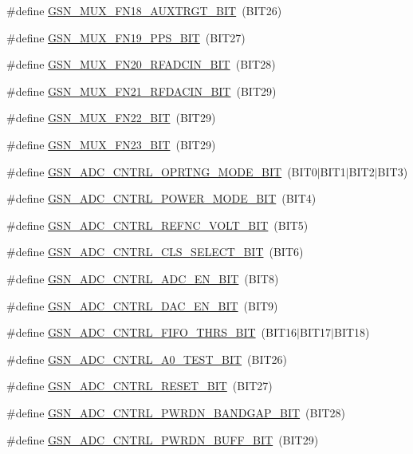 \begin{DoxyCompactItemize}
\item 
\#define \hyperlink{a00546_ab9ab01862c25de4775d41150ca7ac187}{GSN\_\-MUX\_\-FN18\_\-AUXTRGT\_\-BIT}~(BIT26)
\item 
\#define \hyperlink{a00546_a34e272cdfe3fdf3d66d84e62a5d82b6c}{GSN\_\-MUX\_\-FN19\_\-PPS\_\-BIT}~(BIT27)
\item 
\#define \hyperlink{a00546_a2b9c0a55b7508a30e3f610bfc5fc1721}{GSN\_\-MUX\_\-FN20\_\-RFADCIN\_\-BIT}~(BIT28)
\item 
\#define \hyperlink{a00546_a7d2bd2e76493f7c296ad08d8540e06d1}{GSN\_\-MUX\_\-FN21\_\-RFDACIN\_\-BIT}~(BIT29)
\item 
\#define \hyperlink{a00546_a9650fe368133c0fc9d6fae953bf37106}{GSN\_\-MUX\_\-FN22\_\-BIT}~(BIT29)
\item 
\#define \hyperlink{a00546_a88e9d2cb50c9d1779d5020cf87f7e422}{GSN\_\-MUX\_\-FN23\_\-BIT}~(BIT29)
\item 
\#define \hyperlink{a00546_a6a6222308a1c12f65f8f46889f913f22}{GSN\_\-ADC\_\-CNTRL\_\-OPRTNG\_\-MODE\_\-BIT}~(BIT0$|$BIT1$|$BIT2$|$BIT3)
\item 
\#define \hyperlink{a00546_a2cf796a94684c64e71ede0c414b047ed}{GSN\_\-ADC\_\-CNTRL\_\-POWER\_\-MODE\_\-BIT}~(BIT4)
\item 
\#define \hyperlink{a00546_aa9ee7bc270da8f7d9cc502d237b33838}{GSN\_\-ADC\_\-CNTRL\_\-REFNC\_\-VOLT\_\-BIT}~(BIT5)
\item 
\#define \hyperlink{a00546_a3882fadc88f86eb405a4fe78f0d26be5}{GSN\_\-ADC\_\-CNTRL\_\-CLS\_\-SELECT\_\-BIT}~(BIT6)
\item 
\#define \hyperlink{a00546_a2a7aca33a7937b93d109725a499b9a25}{GSN\_\-ADC\_\-CNTRL\_\-ADC\_\-EN\_\-BIT}~(BIT8)
\item 
\#define \hyperlink{a00546_a662469675c433fbde7feee3956b079a7}{GSN\_\-ADC\_\-CNTRL\_\-DAC\_\-EN\_\-BIT}~(BIT9)
\item 
\#define \hyperlink{a00546_a457c6a45703f9e10f3babba23fc5dd51}{GSN\_\-ADC\_\-CNTRL\_\-FIFO\_\-THRS\_\-BIT}~(BIT16$|$BIT17$|$BIT18)
\item 
\#define \hyperlink{a00546_aacb13c1037271227e06e54a62b2b1fa7}{GSN\_\-ADC\_\-CNTRL\_\-A0\_\-TEST\_\-BIT}~(BIT26)
\item 
\#define \hyperlink{a00546_a0fc6f6aa9f2c82b8c88736603f42b6cd}{GSN\_\-ADC\_\-CNTRL\_\-RESET\_\-BIT}~(BIT27)
\item 
\#define \hyperlink{a00546_a5dbdc3da58fad6e8d102101a8f834a35}{GSN\_\-ADC\_\-CNTRL\_\-PWRDN\_\-BANDGAP\_\-BIT}~(BIT28)
\item 
\#define \hyperlink{a00546_a83d109daf1875baaffe5fbc4567200b2}{GSN\_\-ADC\_\-CNTRL\_\-PWRDN\_\-BUFF\_\-BIT}~(BIT29)

\end{DoxyCompactItemize}
